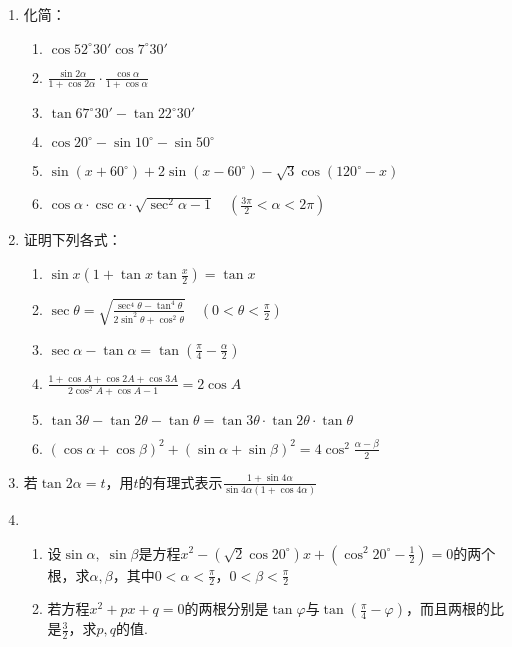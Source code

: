 \begin{enumerate}
\item 化简：
\begin{enumerate}[(1)]
    \item $\cos52^{\circ}30'\cos 7^{\circ}30'$
    \item $\frac{\sin2\alpha}{1+\cos2\alpha}\cdot \frac{\cos\alpha}{1+\cos\alpha}$
    \item $\tan67^{\circ}30'-\tan22^{\circ}30'$
    \item $\cos20^{\circ}-\sin10^{\circ}-\sin50^{\circ}$
    \item $\sin(x+60^{\circ})+2\sin(x-60^{\circ})-\sqrt{3}\cos(120^{\circ}-x)$
    \item $\cos\alpha\cdot \csc\alpha\cdot \sqrt{\sec^2\alpha-1}\quad \left(\frac{3\pi}{2}<\alpha<2\pi\right)$
\end{enumerate}

\item 证明下列各式：
\begin{enumerate}[(1)]
    \item $\sin x\left(1+\tan x\tan\frac{x}{2}\right)=\tan x$
    \item $\sec\theta=\sqrt{\frac{\sec^4\theta-\tan^4\theta}{2\sin^2\theta+\cos^2\theta}}\quad \left(0<\theta<\frac{\pi}{2}\right)$
    \item $\sec\alpha-\tan\alpha=\tan\left(\frac{\pi}{4}-\frac{\alpha}{2}\right)$
    \item $\frac{1+\cos A+\cos 2A+\cos3A}{2\cos^2A+\cos A-1}=2\cos A$
    \item $\tan3\theta-\tan2\theta-\tan\theta=\tan3\theta\cdot \tan2\theta\cdot \tan\theta$
    \item $(\cos\alpha+\cos\beta)^2+(\sin\alpha+\sin\beta)^2=4\cos^2\frac{\alpha-\beta}{2}$
\end{enumerate}
\item 若$\tan2\alpha=t$，用$t$的有理式表示$\frac{1+\sin 4\alpha}{\sin4\alpha(1+\cos4\alpha)}$
\item \begin{enumerate}[(1)]
    \item 设$\sin\alpha,\; \sin\beta$是方程$x^2-\left(\sqrt{2}\cos 20^{\circ}\right)x+\left(\cos^2 20^{\circ}-\frac{1}{2}\right)=0$的两个根，求$\alpha,\beta$，其中$0<\alpha<\frac{\pi}{2}$，$0<\beta<\frac{\pi}{2}$
    \item 若方程$x^2+px+q=0$的两根分别是$\tan\varphi$与$\tan\left(\frac{\pi}{4}-\varphi\right)$，而且两根的比是$\frac{3}{2}$，求$p,q$的值.
\end{enumerate}


\end{enumerate}
